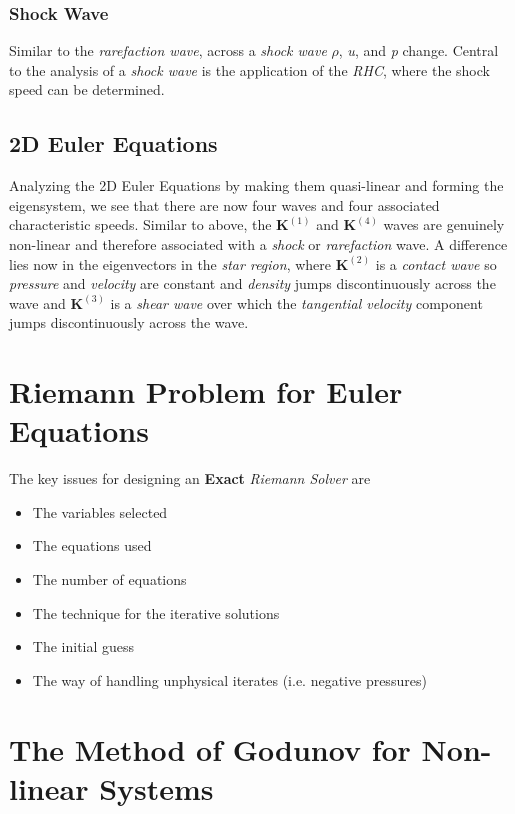 \documentclass[]{article}
\begin{document}
		\subsubsection{Shock Wave}
			Similar to the \textit{rarefaction wave}, across a \textit{shock wave} $ \rho $, \textit{u}, and \textit{p} change. Central to the analysis of a \textit{shock wave} is the application of the \textit{RHC}, where the shock speed can be determined. 
			
		\subsection{2D Euler Equations}
			Analyzing the 2D Euler Equations by making them quasi-linear and forming the eigensystem, we see that there are now four waves and four associated characteristic speeds. Similar to above, the $ \textbf{K}^{(1)} $ and $ \textbf{K}^{(4)} $ waves are genuinely non-linear and therefore associated with a \textit{shock} or \textit{rarefaction} wave. A difference lies now in the eigenvectors in the \textit{star region}, where $ \textbf{K}^{(2)} $ is a \textit{contact wave} so \textit{pressure} and \textit{velocity} are constant and \textit{density} jumps discontinuously across the wave and $ \textbf{K}^{(3)} $ is a \textit{shear wave} over which the \textit{tangential velocity} component jumps discontinuously across the wave.	
		
\section{Riemann Problem for Euler Equations}
	The key issues for designing an \textbf{Exact} \textit{Riemann Solver} are \begin{itemize}
		\item The variables selected
		\item The equations used
		\item The number of equations
		\item The technique for the iterative solutions
		\item The initial guess
		\item The way of handling unphysical iterates (i.e. negative pressures)
	\end{itemize}
		
\section{The Method of Godunov for Non-linear Systems}
		
\end{document}
